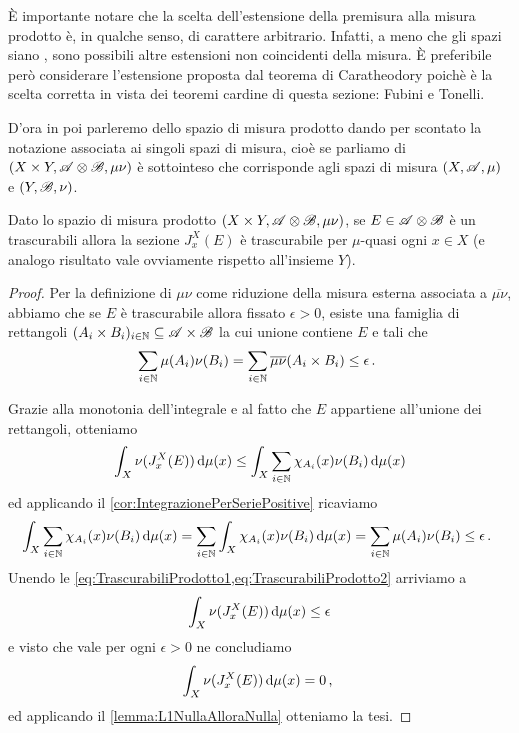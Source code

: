 È importante notare che la scelta dell'estensione della premisura alla misura prodotto è, in qualche senso, di carattere arbitrario. Infatti, a meno che gli spazi siano \sigfin[i], sono possibili altre estensioni non coincidenti della misura. 
È preferibile però considerare l'estensione proposta dal teorema di Caratheodory poichè è la scelta corretta in vista dei teoremi cardine di questa sezione: Fubini e Tonelli.

D'ora in poi parleremo dello spazio di misura prodotto dando per scontato la notazione associata ai singoli spazi di misura, cioè se parliamo di $(X\times Y,\mathscr A\otimes\mathscr B,\mu\nu)$ è sottointeso che corrisponde agli spazi di misura $(X,\mathscr A,\mu)$ e $(Y,\mathscr B,\nu)$.

\begin{proposition}\label{prop:TrascurabiliProdotto}
	Dato lo spazio di misura prodotto $(X\times Y,\mathscr A\otimes\mathscr B,\mu\nu)$, se $E\in\mathscr A\otimes\mathscr B$ è un trascurabili allora la sezione $J_x^X(E)$ è trascurabile per $\mu$-quasi ogni $x\in X$ (e analogo risultato vale ovviamente rispetto all'insieme $Y$).
\end{proposition}
\begin{proof}
	Per la definizione di $\mu\nu$ come riduzione della misura esterna associata a $\overline{\mu\nu}$, abbiamo che se $E$ è trascurabile allora fissato $\epsilon>0$, esiste una famiglia di rettangoli $(A_i\times B_i)_{i\in\mathbb N}\subseteq \mathscr A\times\mathscr B$ la cui unione contiene $E$ e tali che
	\begin{equation*}
		\sum_{i\in\mathbb N}\mu(A_i)\nu(B_i)=\sum_{i\in\mathbb N}\overline{\mu\nu}(A_i\times B_i)\le\epsilon \, \text{. }
	\end{equation*}
	
	Grazie alla monotonia dell'integrale e al fatto che $E$ appartiene all'unione dei rettangoli, otteniamo
	\begin{equation}\label{eq:TrascurabiliProdotto1}
		\int_X \nu(J_x^X(E))\,\mathrm d\mu(x)\le \int_X \sum_{i\in\mathbb N}\chi_{A_i}(x)\nu(B_i)\,\mathrm d\mu(x)
	\end{equation}
	ed applicando il \cref{cor:IntegrazionePerSeriePositive} ricaviamo
	\begin{equation}\label{eq:TrascurabiliProdotto2}
		\int_X \sum_{i\in\mathbb N}\chi_{A_i}(x)\nu(B_i)\,\mathrm d\mu(x)= \sum_{i\in\mathbb N}\int_X \chi_{A_i}(x)\nu(B_i)\,\mathrm d\mu(x)=\sum_{i\in\mathbb N}\mu(A_i)\nu(B_i)\le\epsilon\, \text{. }
	\end{equation}
	Unendo le \cref{eq:TrascurabiliProdotto1,eq:TrascurabiliProdotto2} arriviamo a
	\begin{equation*}
		\int_X \nu(J_x^X(E))\,\mathrm d\mu(x)\le \epsilon
	\end{equation*}
	e visto che vale per ogni $\epsilon>0$ ne concludiamo
	\begin{equation*}
		\int_X \nu(J_x^X(E))\,\mathrm d\mu(x)=0\, \text{, }
	\end{equation*}
	ed applicando il \cref{lemma:L1NullaAlloraNulla} otteniamo la tesi.
\end{proof}

